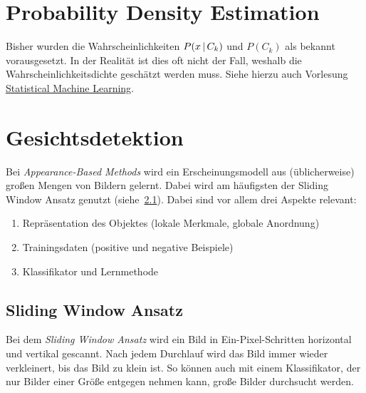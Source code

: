 	\section{Probability Density Estimation}
		Bisher wurden die Wahrscheinlichkeiten \( P(x \,\vert\, C_k) \) und \( P(C_k) \) als bekannt vorausgesetzt. In der Realität ist dies oft nicht der Fall, weshalb die Wahrscheinlichkeitsdichte geschätzt werden muss. Siehe hierzu auch Vorlesung \href{https://fabian.damken.net/summaries/cs/elective/vc/statml/}{Statistical Machine Learning}.

	\section{Gesichtsdetektion}
		Bei \emph{Appearance-Based Methods} wird ein Erscheinungsmodell aus (üblicherweise) großen Mengen von Bildern gelernt. Dabei wird am häufigsten der Sliding Window Ansatz genutzt (siehe~\ref{sec:slidingwindow}). Dabei sind vor allem drei Aspekte relevant:
		\begin{enumerate}
			\item Repräsentation des Objektes (lokale Merkmale, globale Anordnung)
			\item Trainingsdaten (positive und negative Beispiele)
			\item Klassifikator und Lernmethode
		\end{enumerate}

		\subsection{Sliding Window Ansatz}
			\label{sec:slidingwindow}

			Bei dem \emph{Sliding Window Ansatz} wird ein Bild in Ein-Pixel-Schritten horizontal und vertikal gescannt. Nach jedem Durchlauf wird das Bild immer wieder verkleinert, bis das Bild zu klein ist. So können auch mit einem Klassifikator, der nur Bilder einer Größe entgegen nehmen kann, große Bilder durchsucht werden.

